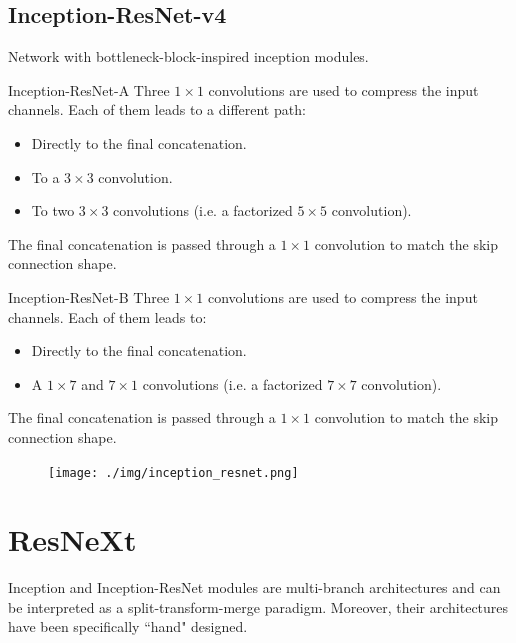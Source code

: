 \subsection{Inception-ResNet-v4}

Network with bottleneck-block-inspired inception modules.

\begin{descriptionlist}
    \item[Inception-ResNet-A] 
        Three $1 \times 1$ convolutions are used to compress the input channels. Each of them leads to a different path:
        \begin{itemize}
            \item Directly to the final concatenation.
            \item To a $3 \times 3$ convolution.
            \item To two $3 \times 3$ convolutions (i.e. a factorized $5 \times 5$ convolution). 
        \end{itemize}
        The final concatenation is passed through a $1 \times 1$ convolution to match the skip connection shape.

    \item[Inception-ResNet-B] 
        Three $1 \times 1$ convolutions are used to compress the input channels. Each of them leads to:
        \begin{itemize}
            \item Directly to the final concatenation.
            \item A $1 \times 7$ and $7 \times 1$ convolutions (i.e. a factorized $7 \times 7$ convolution). 
        \end{itemize}
        The final concatenation is passed through a $1 \times 1$ convolution to match the skip connection shape.
\end{descriptionlist}

\begin{figure}[H]
    \centering
    \texttt{[image: ./img/inception\_resnet.png]}
\end{figure}


\graphicspath{}



\section{ResNeXt}

\begin{remark}
    Inception and Inception-ResNet modules are multi-branch architectures and can be interpreted as a split-transform-merge paradigm. Moreover, their architectures have been specifically ``hand" designed.
\end{remark}

